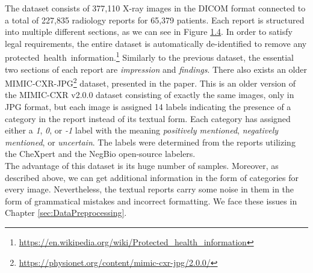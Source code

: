 The dataset consists of 377,110 X-ray images in the DICOM format connected to a total of 227,835 radiology reports for 65,379 patients. Each report is structured into multiple different sections, as we can see in Figure \hyperref[fig04:MimicCXRSample]{1.4}. In order to satisfy legal requirements, the entire dataset is automatically de-identified to remove any protected~health~information.\footnote[9]{\url{https://en.wikipedia.org/wiki/Protected\_health\_information}} Similarly to the previous dataset, the essential two sections of each report are \textit{impression} and \textit{findings}. There also exists an older MIMIC-CXR-JPG\footnote[10]{\url{https://physionet.org/content/mimic-cxr-jpg/2.0.0/}} dataset, presented in the \citet{cxr-jpg:johnson2019mimic} paper. This is an older version of the MIMIC-CXR v2.0.0 dataset consisting of exactly the same images, only in JPG format, but each image is assigned 14 labels indicating the presence of a category in the report instead of its textual form. Each category has assigned either a \textit{1}, \textit{0}, or \textit{-1} label with the meaning \textit{positively mentioned}, \textit{negatively mentioned}, or \textit{uncertain}. The labels were determined from the reports utilizing the CheXpert\citep{irvin2019chexpert} and the NegBio\citep{peng2018negbio} open-source labelers.\\

The advantage of this dataset is its huge number of samples. Moreover, as described above, we can get additional information in the form of categories for every image. Nevertheless, the textual reports carry some noise in them in the form of grammatical mistakes and incorrect formatting. We face these issues in Chapter \ref{sec:DataPreprocessing}. 

